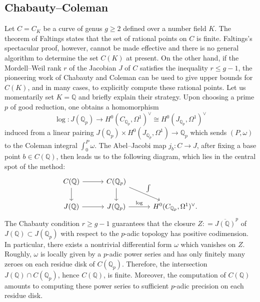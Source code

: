 \documentclass[11pt,oneside]{amsart}
\theoremstyle{plain}
\theoremstyle{definition}
\def\lra{{\longrightarrow}}
\def\Q{\mathbb{Q}}
\def\ra{\rightarrow}
\begin{document}
\subsection{Chabauty--Coleman}\label{ss:CC_method}
Let $C = C_K$ be a curve of genus $g \ge 2$ defined over a number field $K$. The theorem of Faltings states that the set of rational points on $C$ is finite. Faltings's spectacular proof, however, cannot be made effective and there is no general algorithm to determine the set $C(K)$ at present. On the other hand, if the Mordell--Weil rank $r$ of the Jacobian $J$  of $C$ satisfies the inequality  
$r \le g -1$,  the pioneering work of Chabauty and Coleman  \cite{chab41, coleman}  can be used to give upper bounds for $C(K)$, and in many cases, to explicitly compute these rational points. 
Let us momentarily set $K = \Q$ and briefly explain their strategy. Upon choosing a prime $p$ of good reduction, one obtains a homomorphism 
$$\log: J (\Q_p) \lra H^0 (C_{\Q_p}, \Omega^1)^{\vee} \cong H^0 (J_{\Q_p}, \Omega^1)^{\vee} $$
induced from a linear pairing 
$J(\Q_p) \times H^0 (J_{\Q_p}, \Omega^1) \longrightarrow \Q_p$ which sends $(P, \omega)$ to the Coleman integral $\int_{0}^P \omega$. The Abel--Jacobi map $j_b: C \ra J$, after fixing a base point $b \in C(\Q)$, then leads us to the following diagram, which lies in the central spot of the method: 
\[
\begin{tikzcd}[column sep = 3em] 
C(\Q) \arrow[r] \arrow[d] & C(\Q_p)  \arrow[d] \arrow[rd, "\int"] \\
J(\Q) \arrow[r] & J (\Q_p)   \arrow[r, "\log"] & H^0 (C_{\Q_p}, \Omega^1)^{\vee}.
\end{tikzcd}
\]
The Chabauty condition $r \ge g - 1$ guarantees that the closure $Z : = \overline{J(\Q)}^p$ of $J(\Q) \subset J (\Q_p)$ with respect to the $p$-adic topology has positive codimension. In particular, there exists a nontrivial differential form $\omega$ which vanishes on $Z$. Roughly, $\omega$ is locally given by a $p$-adic power series and has only finitely many zeroes on each residue disk of $C(\Q_p)$. Therefore, the intersection $J(\Q) \cap C(\Q_p)$, hence $C(\Q)$, is finite. Moreover, the computation of $C(\Q)$ amounts to computing these power series to sufficient $p$-adic precision on each residue disk.  
\end{document}
